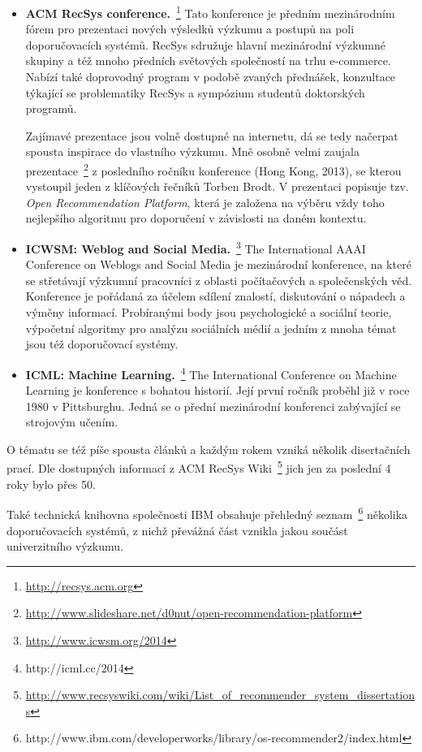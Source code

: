 \documentclass[thesis=M,czech]{FITthesis}[2014/05/07]
\begin{document}
\begin{itemize}
  \item \textbf{ACM RecSys conference.}~\footnote{\url{http://recsys.acm.org}} Tato konference je předním mezinárodním fórem pro prezentaci nových výsledků výzkumu a postupů na poli doporučovacích systémů. RecSys sdružuje hlavní mezinárodní výzkumné skupiny a též mnoho předních světových společností na trhu e-commerce. Nabízí také doprovodný program v podobě zvaných přednášek, konzultace týkající se problematiky RecSys a sympózium studentů doktorských programů. 
  
  Zajímavé prezentace jsou volně dostupné na internetu, dá se tedy načerpat spousta inspirace do vlastního výzkumu. Mně osobně velmi zaujala prezentace~\footnote{\url{http://www.slideshare.net/d0nut/open-recommendation-platform}} z posledního ročníku konference (Hong Kong, 2013), se kterou vystoupil jeden z klíčových řečníků Torben Brodt. V prezentaci popisuje tzv. \emph{Open Recommendation Platform}, která je založena na výběru vždy toho nejlepšího algoritmu pro doporučení v závislosti na daném kontextu. 
  
  \item \textbf{ICWSM: Weblog and Social Media.}~\footnote{\url{http://www.icwsm.org/2014}} The International AAAI Conference on Weblogs and Social Media je mezinárodní konference, na které se střetávají výzkumní pracovníci z oblasti počítačových a společenských věd. Konference je pořádaná za účelem sdílení znalostí, diskutování o nápadech a výměny informací. Probíranými body jsou psychologické a sociální teorie, výpočetní algoritmy pro analýzu sociálních médií a jedním z mnoha témat jsou též doporučovací systémy.
  \item \textbf{ICML: Machine  Learning.}~\footnote{http://icml.cc/2014} The International Conference on Machine Learning je konference s bohatou historií. Její první ročník proběhl již v roce 1980 v Pittsburghu. Jedná se o přední mezinárodní konferenci zabývající se strojovým učením. 
\end{itemize}

O tématu se též píše spousta článků a každým rokem vzniká několik disertačních prací. Dle dostupných informací z ACM RecSys Wiki~\footnote{\url{http://www.recsyswiki.com/wiki/List_of_recommender_system_dissertations}} jich jen za poslední 4 roky bylo přes 50. 

Také technická knihovna společnosti IBM obsahuje přehledný seznam~\footnote{http://www.ibm.com/developerworks/library/os-recommender2/index.html} několika doporučovacích systémů, z nichž převážná část vznikla jakou součást univerzitního výzkumu.
\end{document}
